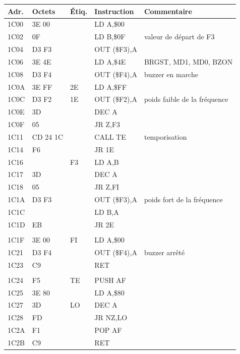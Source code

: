 \documentclass[a4paper,10pt]{article}
\makeatletter
\newenvironment{asm}
  {\small\begin{longtable}{@{}>{\ttfamily}l>{\ttfamily}l>{\ttfamily}l>{\ttfamily}l>{\raggedright\arraybackslash}p{6.2cm}@{}}
   \toprule
   \normalfont\bfseries Adr. & \normalfont\bfseries Octets & \normalfont\bfseries Étiq. & \normalfont\bfseries Instruction & \textbf{Commentaire}\\
   \midrule\endhead
   \bottomrule\endfoot}
  {\end{longtable}}
\makeatother
\begin{document}
\begin{asm}
1C00 & 3E 00    &    & LD A,\$00      & \\
1C02 & 06 0F    &    & LD B,\$0F      & valeur de départ de F3 \\
1C04 & D3 F3    &    & OUT (\$F3),A   & \\
1C06 & 3E 4E    &    & LD A,\$4E      & BRGST, MD1, MD0, BZON \\
1C08 & D3 F4    &    & OUT (\$F4),A   & buzzer en marche \\
1C0A & 3E FF    & 2E & LD A,\$FF      & \\
1C0C & D3 F2    & 1E & OUT (\$F2),A   & poids faible de la fréquence \\
1C0E & 3D       &    & DEC A          & \\
1C0F & 28 05    &    & JR Z,F3        & \\
1C11 & CD 24 1C &    & CALL TE        & temporisation \\
1C14 & 18 F6    &    & JR 1E          & \\
1C16 & 78       & F3 & LD A,B         & \\
1C17 & 3D       &    & DEC A          & \\
1C18 & 28 05    &    & JR Z,FI        & \\
1C1A & D3 F3    &    & OUT (\$F3),A   & poids fort de la fréquence \\
1C1C & 47       &    & LD B,A         & \\
1C1D & 18 EB    &    & JR 2E          & \\
\multicolumn{5}{@{}l}{\small\itshape Arrêt} \\
1C1F & 3E 00    & FI & LD A,\$00      & \\
1C21 & D3 F4    &    & OUT (\$F4),A   & buzzer arrêté \\
1C23 & C9       &    & RET            & \\
\multicolumn{5}{@{}l}{\small\itshape Temporisation} \\
1C24 & F5       & TE & PUSH AF        & \\
1C25 & 3E 80    &    & LD A,\$80      & \\
1C27 & 3D       & LO & DEC A          & \\
1C28 & 20 FD    &    & JR NZ,LO       & \\
1C2A & F1       &    & POP AF         & \\
1C2B & C9       &    & RET            & \\
\end{asm}
\end{document}
